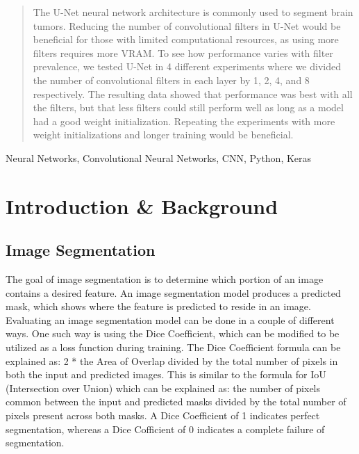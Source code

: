 \documentclass[conference]{IEEEtran}
\begin{document}
\begin{abstract}
The U-Net neural network architecture is commonly used to segment brain tumors. Reducing the number of convolutional filters in U-Net would be beneficial for those with limited computational resources, as using more filters requires more VRAM. To see how performance varies with filter prevalence, we tested U-Net in 4 different experiments where we divided the number of convolutional filters in each layer by 1, 2, 4, and 8 respectively. The resulting data showed that performance was best with all the filters, but that less filters could still perform well as long as a model had a good weight initialization. Repeating the experiments with more weight initializations and longer training would be beneficial.

\end{abstract}


\begin{IEEEkeywords}
Neural Networks, Convolutional Neural Networks, CNN, Python, Keras
\end{IEEEkeywords}

\section{Introduction \& Background}

\subsection{Image Segmentation}
The goal of image segmentation is to determine which portion of an image contains a desired feature. An image segmentation model produces a predicted mask, which shows where the feature is predicted to reside in an image. Evaluating an image segmentation model can be done in a couple of different ways. One such way is using the Dice Coefficient, which can be modified to be utilized as a loss function during training. The Dice Coefficient formula can be explained as: 2 * the Area of Overlap divided by the total number of pixels in both the input and predicted images. This is similar to the formula for IoU (Intersection over Union) which can be explained as: the number of pixels common between the input and predicted masks divided by the total number of pixels present across both masks. A Dice Coefficient of 1 indicates perfect segmentation, whereas a Dice Cofficient of 0 indicates a complete failure of  segmentation.
\end{document}
